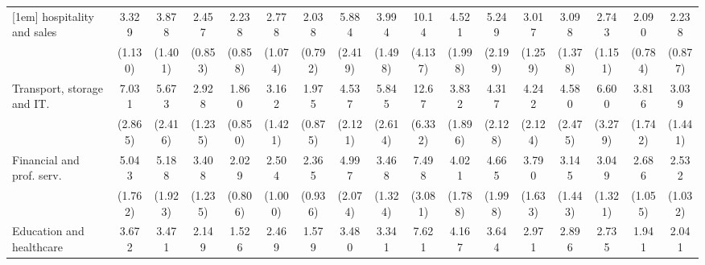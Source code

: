 {\begin{tabular}{l*{16}{c}}
[1em]
hospitality and sales&       3.329\sym{***}&       3.878\sym{***}&       2.457\sym{**} &       2.238\sym{*}  &       2.778\sym{**} &       2.038         &       5.884\sym{***}&       3.994\sym{***}&       10.14\sym{***}&       4.521\sym{***}&       5.249\sym{***}&       3.017\sym{**} &       3.098\sym{*}  &       2.743\sym{*}  &       2.090\sym{*}  &       2.238\sym{*}  \\
                    &     (1.130)         &     (1.401)         &     (0.853)         &     (0.858)         &     (1.074)         &     (0.792)         &     (2.419)         &     (1.498)         &     (4.137)         &     (1.998)         &     (2.199)         &     (1.259)         &     (1.378)         &     (1.151)         &     (0.784)         &     (0.877)         \\
[1em]
Transport, storage and IT.&       7.031\sym{***}&       5.673\sym{***}&       2.928\sym{*}  &       1.860         &       3.162\sym{*}  &       1.975         &       4.537\sym{**} &       5.845\sym{***}&       12.67\sym{***}&       3.832\sym{**} &       4.317\sym{**} &       4.242\sym{**} &       4.580\sym{**} &       6.600\sym{***}&       3.816\sym{**} &       3.039\sym{*}  \\
                    &     (2.865)         &     (2.416)         &     (1.235)         &     (0.850)         &     (1.421)         &     (0.875)         &     (2.121)         &     (2.614)         &     (6.332)         &     (1.896)         &     (2.128)         &     (2.124)         &     (2.475)         &     (3.279)         &     (1.742)         &     (1.441)         \\
[1em]
Financial and prof. serv.&       5.043\sym{***}&       5.188\sym{***}&       3.408\sym{***}&       2.029         &       2.504\sym{*}  &       2.365\sym{*}  &       4.997\sym{***}&       3.468\sym{**} &       7.498\sym{***}&       4.021\sym{**} &       4.665\sym{***}&       3.790\sym{**} &       3.145\sym{*}  &       3.049\sym{*}  &       2.686\sym{*}  &       2.532\sym{*}  \\
                    &     (1.762)         &     (1.923)         &     (1.235)         &     (0.806)         &     (1.000)         &     (0.936)         &     (2.074)         &     (1.324)         &     (3.081)         &     (1.788)         &     (1.998)         &     (1.633)         &     (1.443)         &     (1.321)         &     (1.055)         &     (1.032)         \\
[1em]
Education and healthcare&       3.672\sym{***}&       3.471\sym{***}&       2.149\sym{*}  &       1.526         &       2.469\sym{*}  &       1.579         &       3.480\sym{**} &       3.341\sym{**} &       7.621\sym{***}&       4.167\sym{**} &       3.644\sym{**} &       2.971\sym{*}  &       2.896\sym{*}  &       2.735\sym{*}  &       1.941         &       2.041         \\

\end{tabular}}
